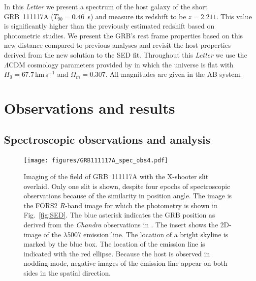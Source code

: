 \documentclass{aa}    %
\begin{document}
In this \emph{Letter} we present a spectrum of the host galaxy of the short GRB~111117A ($T_{90}=0.46$~s) and measure its redshift to be $z=2.211$. This value is significantly higher 
than the previously estimated redshift based on photometric studies. 
We present the GRB's rest frame 
properties based on this new distance compared to previous analyses
\citep{Margutti2012,Sakamoto2013} and revisit the host properties derived from
the new solution to the SED fit. %
Throughout this \emph{Letter} we use the $\Lambda$CDM cosmology parameters provided by
\citet{Planck2015} in which the universe is flat with $H_0 = 67.7$\,km\,s$^{-1}$
and $\Omega_m = 0.307$. All magnitudes are given in the AB system.


\section{Observations and results}

\subsection{Spectroscopic observations and analysis}

\begin{figure}
	\centering
	\texttt{[image: figures/GRB111117A\_spec\_obs4.pdf]}
	\caption{Imaging of the field of GRB~111117A with the X-shooter slit overlaid. Only one slit is shown, despite four epochs of spectroscopic observations because of the similarity in position angle. The image is the FORS2 $R$-band image for which the photometry is shown in Fig.~\ref{fig:SED}. 
	The blue asterisk indicates the GRB position as derived from the \emph{Chandra} observations in \citet{Sakamoto2013}. The insert shows the 2D-image of the \oiii$\lambda$5007 emission line. The location of a bright skyline is marked by the blue box. The location of the emission line is indicated with the red ellipse. Because the host is observed in nodding-mode, negative images of the emission line appear on both sides in the spatial direction.}
	\label{fig:spec_setup}
\end{figure}
\end{document}
